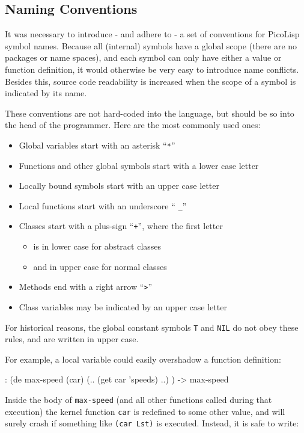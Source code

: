 \subsection{Naming Conventions}
\label{sec:refm-naming-conventions}


It was necessary to introduce - and adhere to - a set of conventions for
PicoLisp symbol names. Because all (internal) symbols have a global
scope (there are no packages or name spaces), and each symbol can only
have either a value or function definition, it would otherwise be very
easy to introduce name conflicts. Besides this, source code readability
is increased when the scope of a symbol is indicated by its name.

These conventions are not hard-coded into the language, but should be so
into the head of the programmer. Here are the most commonly used ones:

\begin{itemize}
\item Global variables start with an asterisk ``\texttt{*}''
\item Functions and other global symbols start with a lower case letter
\item Locally bound symbols start with an upper case letter
\item Local functions start with an underscore `` \texttt{\_}''
\item Classes start with a plus-sign ``\texttt{+}'', where the first letter
\begin{itemize}
\item is in lower case for abstract classes
\item and in upper case for normal classes
\end{itemize}
\item Methods end with a right arrow ``\texttt{>}''
\item Class variables may be indicated by an upper case letter
\end{itemize}

For historical reasons, the global constant symbols \texttt{T} and \texttt{NIL} do not
obey these rules, and are written in upper case.

For example, a local variable could easily overshadow a function
definition:


\begin{wideverbatim}
: (de max-speed (car)
   (.. (get car 'speeds) ..) )
-> max-speed
\end{wideverbatim}

Inside the body of \texttt{max-speed} (and all other functions called during
that execution) the kernel function \texttt{car} is redefined to some other
value, and will surely crash if something like \texttt{(car Lst)} is executed.
Instead, it is safe to write:


